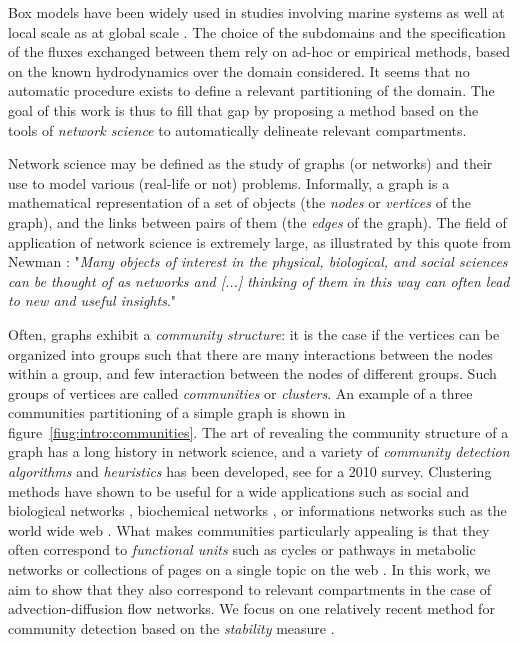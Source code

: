 Box models have been widely used in studies involving marine systems as well at local scale \cite{deleersnijder1998two,maderich2014regional,soetaert1995estimating} as at global scale \cite{kohler2005quantitative,munhoven1996glacial}. The choice of the subdomains and the specification of the fluxes exchanged between them rely on ad-hoc or empirical methods, based on the known hydrodynamics over the domain considered. It seems that no automatic procedure exists to define a relevant partitioning of the domain. The goal of this work is thus to fill that gap by proposing a method based on the tools of \textit{network science} to automatically delineate relevant compartments.

Network science may be defined as the study of graphs (or networks) and their use to model various (real-life or not) problems. Informally, a graph is a mathematical representation of a set of objects (the \textit{nodes} or \textit{vertices} of the graph), and the links between pairs of them (the \textit{edges} of the graph). The field of application of network science is extremely large, as illustrated by this quote from Newman \cite{newman2010networks}: "\textit{Many objects of interest in the physical, biological, and social sciences can be thought of as networks and [...] thinking of them in this way can often lead to new and useful insights}."

Often, graphs exhibit a \textit{community structure}: it is the case if the vertices can be organized into groups such that there are many interactions between the nodes within a group, and few interaction between the nodes of different groups. Such groups of vertices are called \textit{communities} or \textit{clusters}. An example of a three communities partitioning of a simple graph is shown in figure~\ref{fiug:intro:communities}. The art of revealing the community structure of a graph has a long history in network science, and a variety of \textit{community detection algorithms} and \textit{heuristics} has been developed, see \cite{fortunato2010community} for a 2010 survey. Clustering methods have shown to be useful for a wide applications such as social and biological networks \cite{girvan2002community}, biochemical networks \cite{holme2003subnetwork,guimera2005functional,palla2005uncovering}, or informations networks such as the world wide web \cite{flake2002self}. What makes communities particularly appealing is that they often correspond to \textit{functional units} such as cycles or pathways in metabolic networks \cite{guimera2005functional,palla2005uncovering,huss2007currency} or collections of pages on a single topic on the web \cite{flake2002self}. In this work, we aim to show that they also correspond to relevant compartments in the case of advection-diffusion flow networks. We focus on one relatively recent method for community detection based on the \textit{stability} measure \cite{delvenne2010stability,delvenne2013stability,lambiotte2009laplacian}.

